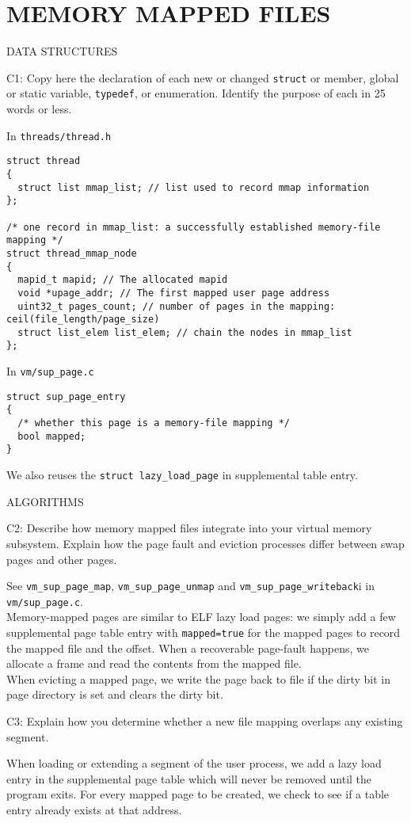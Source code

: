 \section*{MEMORY MAPPED FILES}

\begin{aspect}{DATA STRUCTURES}
	\begin{qc}
		C1: Copy here the declaration of each new or changed \lstinline{struct} or member,
		global or static variable, \lstinline{typedef}, or enumeration.
		Identify the purpose of each in 25 words or less.
	\end{qc}

	In \lstinline{threads/thread.h}
	\begin{lstlisting}
struct thread
{
  struct list mmap_list; // list used to record mmap information
};

/* one record in mmap_list: a successfully established memory-file mapping */
struct thread_mmap_node
{
  mapid_t mapid; // The allocated mapid
  void *upage_addr; // The first mapped user page address
  uint32_t pages_count; // number of pages in the mapping: ceil(file_length/page_size)
  struct list_elem list_elem; // chain the nodes in mmap_list
};
			\end{lstlisting}
	In \lstinline{vm/sup_page.c}
	\begin{lstlisting}
struct sup_page_entry
{
  /* whether this page is a memory-file mapping */
  bool mapped;
}
	\end{lstlisting}
	We also reuses the \lstinline{struct lazy_load_page} in supplemental table entry.
\end{aspect}


\begin{aspect}{ALGORITHMS}
	\begin{qc}
		C2: Describe how memory mapped files integrate into your virtual memory subsystem.
		Explain how the page fault and eviction processes differ between swap pages and other pages.
	\end{qc}
	See \lstinline{vm_sup_page_map}, \lstinline{vm_sup_page_unmap} and \lstinline{vm_sup_page_writeback}i in \lstinline{vm/sup_page.c}.\\
	Memory-mapped pages are similar to ELF lazy load pages:
	we simply add a few supplemental page table entry with \lstinline{mapped=true} for the mapped pages to record the mapped file and the offset.
	When a recoverable page-fault happens, we allocate a frame and read the contents from the mapped file.\\

	When evicting a mapped page, we write the page back to file if the dirty bit in page directory is set and clears the dirty bit.\\

	\begin{qc}
		C3: Explain how you determine whether a new file mapping overlaps any existing segment.
	\end{qc}
	When loading or extending a segment of the user process, we add a lazy load entry in the supplemental page table which will never be removed until the program exits.
	For every mapped page to be created, we check to see if a table entry already exists at that address.
\end{aspect}


